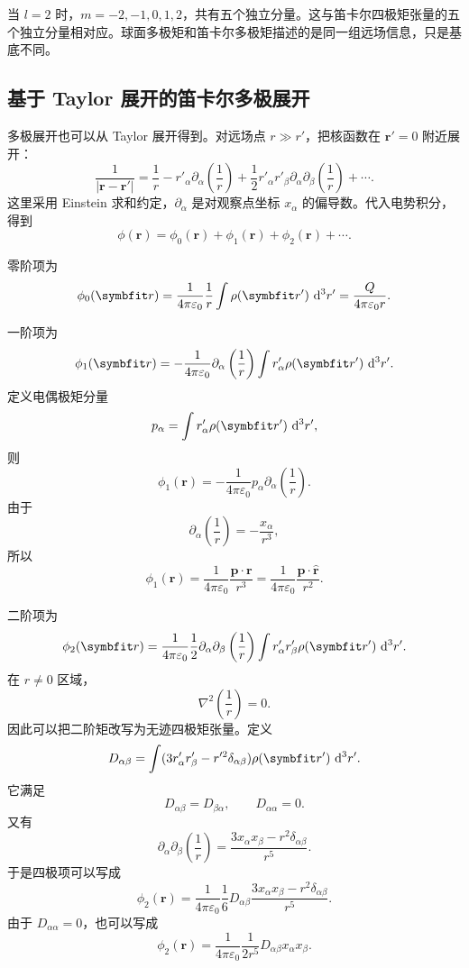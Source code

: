 当 $l=2$ 时，$m=-2,-1,0,1,2$，共有五个独立分量。这与笛卡尔四极矩张量的五个独立分量相对应。球面多极矩和笛卡尔多极矩描述的是同一组远场信息，只是基底不同。

\subsection{基于 Taylor 展开的笛卡尔多极展开}

多极展开也可以从 Taylor 展开得到。对远场点 $r\gg r'$，把核函数在 $\bm{r}'=0$ 附近展开：
\[
\frac{1}{|\bm{r}-\bm{r}'|}
=
\frac{1}{r}
-
r'_{\alpha}\partial_{\alpha}\left(\frac{1}{r}\right)
+
\frac{1}{2}
r'_{\alpha}r'_{\beta}
\partial_{\alpha}\partial_{\beta}
\left(\frac{1}{r}\right)
+\cdots.
\]
这里采用 Einstein 求和约定，$\partial_{\alpha}$ 是对观察点坐标 $x_{\alpha}$ 的偏导数。代入电势积分，得到
\[
\phi(\bm{r})
=
\phi_{0}(\bm{r})
+
\phi_{1}(\bm{r})
+
\phi_{2}(\bm{r})
+\cdots.
\]

零阶项为
\[
\phi_{0}(\bm{r})
=
\frac{1}{4\pi\varepsilon_{0}}
\frac{1}{r}
\int \rho(\bm{r}')\,\dif^{3}r'
=
\frac{Q}{4\pi\varepsilon_{0}r}.
\]

一阶项为
\[
\phi_{1}(\bm{r})
=
-\frac{1}{4\pi\varepsilon_{0}}
\partial_{\alpha}\left(\frac{1}{r}\right)
\int r'_{\alpha}\rho(\bm{r}')\,\dif^{3}r'.
\]
定义电偶极矩分量
\[
p_{\alpha}
=
\int r'_{\alpha}\rho(\bm{r}')\,\dif^{3}r',
\]
则
\[
\phi_{1}(\bm{r})
=
-\frac{1}{4\pi\varepsilon_{0}}
p_{\alpha}\partial_{\alpha}\left(\frac{1}{r}\right).
\]
由于
\[
\partial_{\alpha}\left(\frac{1}{r}\right)
=
-\frac{x_{\alpha}}{r^{3}},
\]
所以
\[
\phi_{1}(\bm{r})
=
\frac{1}{4\pi\varepsilon_{0}}
\frac{\bm{p}\cdot\bm{r}}{r^{3}}
=
\frac{1}{4\pi\varepsilon_{0}}
\frac{\bm{p}\cdot\hat{\bm{r}}}{r^{2}}.
\]

二阶项为
\[
\phi_{2}(\bm{r})
=
\frac{1}{4\pi\varepsilon_{0}}
\frac{1}{2}
\partial_{\alpha}\partial_{\beta}
\left(\frac{1}{r}\right)
\int r'_{\alpha}r'_{\beta}\rho(\bm{r}')\,\dif^{3}r'.
\]
在 $r\neq 0$ 区域，
\[
\nabla^{2}\left(\frac{1}{r}\right)=0.
\]
因此可以把二阶矩改写为无迹四极矩张量。定义
\begin{equation}
	D_{\alpha\beta}
	=
	\int
	(3r'_{\alpha}r'_{\beta}-r'^{2}\delta_{\alpha\beta})
	\rho(\bm{r}')
	\,\dif^{3}r'.
	\label{eq:10:quadrupole-tensor}
\end{equation}
它满足
\[
D_{\alpha\beta}=D_{\beta\alpha},
\qquad
D_{\alpha\alpha}=0.
\]
又有
\[
\partial_{\alpha}\partial_{\beta}
\left(\frac{1}{r}\right)
=
\frac{3x_{\alpha}x_{\beta}-r^{2}\delta_{\alpha\beta}}{r^{5}}.
\]
于是四极项可以写成
\[
\phi_{2}(\bm{r})
=
\frac{1}{4\pi\varepsilon_{0}}
\frac{1}{6}
D_{\alpha\beta}
\frac{3x_{\alpha}x_{\beta}-r^{2}\delta_{\alpha\beta}}{r^{5}}.
\]
由于 $D_{\alpha\alpha}=0$，也可以写成
\[
\phi_{2}(\bm{r})
=
\frac{1}{4\pi\varepsilon_{0}}
\frac{1}{2r^{5}}
D_{\alpha\beta}x_{\alpha}x_{\beta}.
\]

